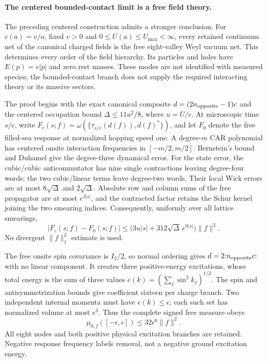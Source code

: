 \paragraph{The centered bounded-contact limit is a free field theory.}
The preceding centered construction admits a stronger conclusion.
For $c(a)=v/a$, fixed $v>0$ and $0\le U(a)\le U_{\max}<\infty$, every
retained continuum net of the canonical charged fields is the free
eight-valley Weyl vacuum net. This determines every order of the field hierarchy. Its particles and holes have
$E(p)=v|p|$ and zero rest masses. These modes are not identified with
measured species; the bounded-contact branch does not supply the
required interacting theory or its massive sectors.

The proof begins with the exact canonical composite
$d=(2n_{\rm opposite}-1)c$ and the centered occupation bound
$\Delta\le11u^2/8$, where $u=U/c$. At microscopic time $s/c$, write
$F_c(s;f)=\omega(\{\tau_{s/c}(d(f)),d(f)^*\})$, and let $F_0$ denote
the free filled-sea response at normalized hopping speed one.
A degree-$m$ CAR polynomial has centered onsite interaction frequencies
in $[-m/2,m/2]$. Bernstein's bound and Duhamel give the degree-three
dynamical error. For the state error, the cubic/cubic anticommutator
has nine single contractions leaving degree-four words; the two
cubic/linear terms leave degree-two words. Their local Wick errors
are at most $8\sqrt\Delta$ and $2\sqrt\Delta$. Absolute row and
column sums of the free propagator are at most $e^{3|s|}$, and the
contracted factor retains the Schur kernel joining the two smearing
indices. Consequently, uniformly over all lattice smearings,
\[
 |F_c(s;f)-F_0(s;f)|\le
 \bigl(3u|s|+312\sqrt\Delta\,e^{9|s|}\bigr)\|f\|^2.
\]
No divergent $\|f\|_1^2$ estimate is used.

The free onsite spin covariance is $I_2/2$, so normal ordering gives
$d=2\mathopen{:}n_{\rm opposite}c\mathclose{:}$ with no linear
component. It creates three positive-energy excitations, whose total
energy is the sum of three values
$e(k)=(\sum_j\sin^2k_j)^{1/2}$. The spin and antisymmetrization bounds
give coefficient sixteen per charge branch. Two independent internal
momenta must have $e(k)\le\epsilon$; each such set has normalized
volume at most $\epsilon^3$. Thus the complete signed free measure obeys
\[
 \mu_{0,f}([-\epsilon,\epsilon])\le32\epsilon^6\|f\|^2.
\]
All eight nodes and both positive physical excitation branches are
retained. Negative response frequency labels removal, not a negative
ground excitation energy.

